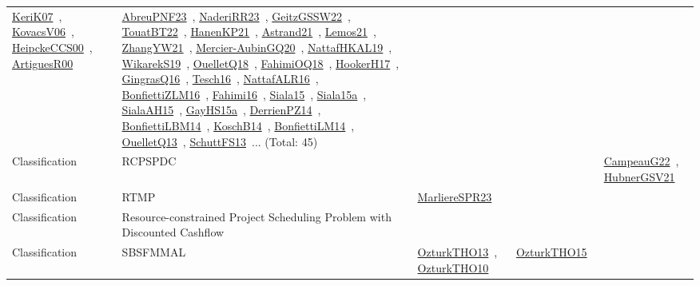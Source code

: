 {\begin{longtable}{lp{3cm}>{\raggedright\arraybackslash}p{6cm}>{\raggedright\arraybackslash}p{6cm}>{\raggedright\arraybackslash}p{8cm}}
\href{../works/KeriK07.pdf}{KeriK07}~\cite{KeriK07}, \href{../works/KovacsV06.pdf}{KovacsV06}~\cite{KovacsV06}, \href{../works/HeipckeCCS00.pdf}{HeipckeCCS00}~\cite{HeipckeCCS00}, \href{../works/ArtiguesR00.pdf}{ArtiguesR00}~\cite{ArtiguesR00} & \href{../works/AbreuPNF23.pdf}{AbreuPNF23}~\cite{AbreuPNF23}, \href{../works/NaderiRR23.pdf}{NaderiRR23}~\cite{NaderiRR23}, \href{../works/GeitzGSSW22.pdf}{GeitzGSSW22}~\cite{GeitzGSSW22}, \href{../works/TouatBT22.pdf}{TouatBT22}~\cite{TouatBT22}, \href{../works/HanenKP21.pdf}{HanenKP21}~\cite{HanenKP21}, \href{../works/Astrand21.pdf}{Astrand21}~\cite{Astrand21}, \href{../works/Lemos21.pdf}{Lemos21}~\cite{Lemos21}, \href{../works/ZhangYW21.pdf}{ZhangYW21}~\cite{ZhangYW21}, \href{../works/Mercier-AubinGQ20.pdf}{Mercier-AubinGQ20}~\cite{Mercier-AubinGQ20}, \href{../works/NattafHKAL19.pdf}{NattafHKAL19}~\cite{NattafHKAL19}, \href{../works/WikarekS19.pdf}{WikarekS19}~\cite{WikarekS19}, \href{../works/OuelletQ18.pdf}{OuelletQ18}~\cite{OuelletQ18}, \href{../works/FahimiOQ18.pdf}{FahimiOQ18}~\cite{FahimiOQ18}, \href{../works/HookerH17.pdf}{HookerH17}~\cite{HookerH17}, \href{../works/GingrasQ16.pdf}{GingrasQ16}~\cite{GingrasQ16}, \href{../works/Tesch16.pdf}{Tesch16}~\cite{Tesch16}, \href{../works/NattafALR16.pdf}{NattafALR16}~\cite{NattafALR16}, \href{../works/BonfiettiZLM16.pdf}{BonfiettiZLM16}~\cite{BonfiettiZLM16}, \href{../works/Fahimi16.pdf}{Fahimi16}~\cite{Fahimi16}, \href{../works/Siala15.pdf}{Siala15}~\cite{Siala15}, \href{../works/Siala15a.pdf}{Siala15a}~\cite{Siala15a}, \href{../works/SialaAH15.pdf}{SialaAH15}~\cite{SialaAH15}, \href{../works/GayHS15a.pdf}{GayHS15a}~\cite{GayHS15a}, \href{../works/DerrienPZ14.pdf}{DerrienPZ14}~\cite{DerrienPZ14}, \href{../works/BonfiettiLBM14.pdf}{BonfiettiLBM14}~\cite{BonfiettiLBM14}, \href{../works/KoschB14.pdf}{KoschB14}~\cite{KoschB14}, \href{../works/BonfiettiLM14.pdf}{BonfiettiLM14}~\cite{BonfiettiLM14}, \href{../works/OuelletQ13.pdf}{OuelletQ13}~\cite{OuelletQ13}, \href{../works/SchuttFS13.pdf}{SchuttFS13}~\cite{SchuttFS13}... (Total: 45)\\
Classification & RCPSPDC &  &  & \href{../works/CampeauG22.pdf}{CampeauG22}~\cite{CampeauG22}, \href{../works/HubnerGSV21.pdf}{HubnerGSV21}~\cite{HubnerGSV21}\\
Classification & RTMP & \href{../works/MarliereSPR23.pdf}{MarliereSPR23}~\cite{MarliereSPR23} &  & \\
Classification & Resource-constrained Project Scheduling Problem with Discounted Cashflow &  &  & \\
Classification & SBSFMMAL & \href{../works/OzturkTHO13.pdf}{OzturkTHO13}~\cite{OzturkTHO13}, \href{../works/OzturkTHO10.pdf}{OzturkTHO10}~\cite{OzturkTHO10} & \href{../works/OzturkTHO15.pdf}{OzturkTHO15}~\cite{OzturkTHO15} & \\

\end{longtable}}
